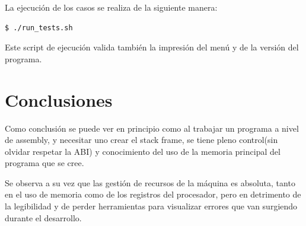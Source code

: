 \documentclass[a4paper,10pt, spanish]{article}
\begin{document}
La ejecución de los casos se realiza de la siguiente manera:

\begin{lstlisting}
$ ./run_tests.sh
\end{lstlisting}

Este script de ejecución valida también la impresión del menú y de la versión del programa.

\section{Conclusiones}

Como conclusión se puede ver en principio como al trabajar un programa a nivel de assembly, y necesitar uno crear el stack frame, se tiene pleno control(sin olvidar respetar la ABI) y conocimiento del uso de la memoria principal del programa que se cree.

Se observa a su vez que las gestión de recursos de la máquina es absoluta, tanto en el uso de memoria como de los registros del procesador, pero en detrimento de la legibilidad y de perder herramientas para visualizar errores que van surgiendo durante el desarrollo.
\end{document}

